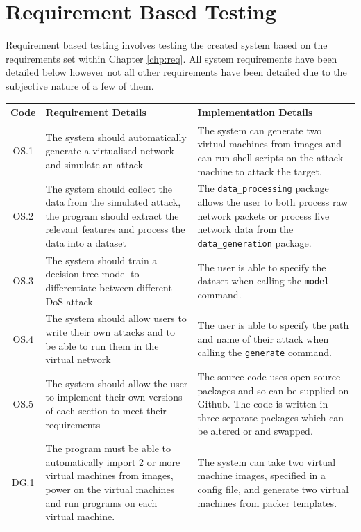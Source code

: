 \section{Requirement Based Testing}
Requirement based testing involves testing the created system based on the requirements set within Chapter \ref{chp:req}. All system requirements have been detailed below however not all other requirements have been detailed due to the subjective nature of a few of them.
    \begin{tabularx}{\textwidth}{|c|X|X|}
    \caption{Implemented Requirements}
    \label{table:irq}\\
    \hline
     \textbf{Code}& \textbf{Requirement Details}&\textbf{Implementation Details}\\
     \hline
     OS.1  & The system should automatically generate a virtualised network and simulate an attack & The system can generate two virtual machines from images and can run shell scripts on the attack machine to attack the target.\\
     \hline
     OS.2 & The system should collect the data from the simulated attack, the program should extract the relevant features and process the data into a dataset & The \texttt{data\_processing} package allows the user to both process raw network packets or process live network data from the \texttt{data\_generation} package. \\
     \hline
     OS.3 & The system should train a decision tree model to differentiate between different DoS attack & The user is able to specify the dataset when calling the \texttt{model} command. \\
     \hline
     OS.4 & The system should allow users to write their own attacks and to be able to run them in the virtual network & The user is able to specify the path and name of their attack when calling the \texttt{generate} command.\\
     \hline
     OS.5 & The system should allow the user to implement their own versions of each section to meet their requirements & The source code uses open source packages and so can be supplied on Github. The code is written in three separate packages which can be altered or and swapped.\\
     \hline
     DG.1 & The program must be able to automatically import 2 or more virtual machines from images, power on the virtual machines and run programs on each virtual machine. & The system can take two virtual machine images, specified in a config file, and generate two virtual machines from packer templates.\\

\end{tabularx}
